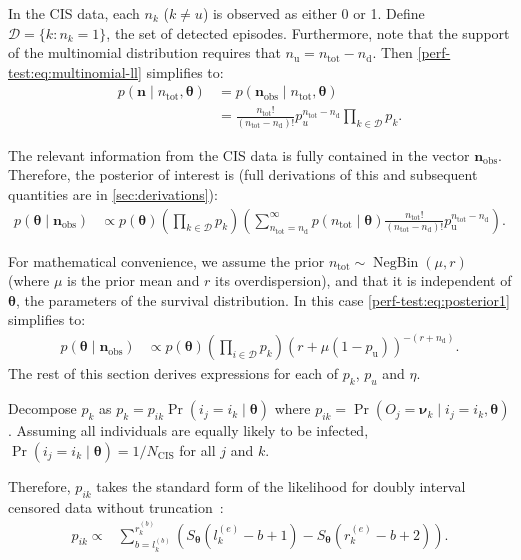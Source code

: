\documentclass[12pt]{article}
\def\dist{\sim}
\DeclareMathOperator{\prob}{\mathrm{Pr}}
\DeclareMathOperator{\NBr}{NegBin}
\newcommand{\NBc}{\NBr}
\newcommand\set{\mathcal}
\renewcommand{\vec}[1]{\bm{#1}}
\newcommand{\ssep}{:}
\newcommand{\ntot}{n_\text{tot}}
\newcommand{\ndet}{n_\text{d}}
\newcommand{\nnodet}{n_\text{u}}
\newcommand{\pnodet}{p_\text{u}}
\newcommand{\Ncis}{N_\text{CIS}}
\newcommand{\na}{\vec{n}_\text{obs}}
\begin{document}
In the CIS data, each $n_k$ ($k \neq u$) is observed as either 0 or 1.
Define $\set{D} = \{ k \ssep n_k = 1 \}$, the set of detected episodes.
Furthermore, note that the support of the multinomial distribution requires that $\nnodet = \ntot - \ndet$.
Then \cref{perf-test:eq:multinomial-ll} simplifies to:
\begin{align}
  p(\vec{n} \mid \ntot, \vec{\theta})
  &= p(\na \mid \ntot, \vec{\theta}) \\
  &= \frac{\ntot!}{(\ntot - \ndet)!} p_u^{\ntot-\ndet} \prod_{k \in \set{D}} p_k.
  \label{perf-test:eq:multinomial}
\end{align}

The relevant information from the CIS data is fully contained in the vector $\na$.
Therefore, the posterior of interest is (full derivations of this and subsequent quantities are in \cref{sec:derivations}):
\begin{align}
p(\vec{\theta} \mid \na)
&\propto  p(\vec{\theta}) \left( \prod_{k \in \set{D}} p_k \right) \left( \sum_{\ntot=\ndet}^\infty p(\ntot \mid \vec{\theta}) \frac{\ntot!}{(\ntot - \ndet)!} \pnodet^{\ntot - \ndet} \right).
\label{perf-test:eq:posterior1}
\end{align}

For mathematical convenience, we assume the prior $\ntot \dist \NBc(\mu, r)$ (where $\mu$ is the prior mean and $r$ its overdispersion), and that it is independent of $\vec{\theta}$, the parameters of the survival distribution.
In this case \cref{perf-test:eq:posterior1} simplifies to:
\begin{align}
p(\vec{\theta} \mid \na)
&\propto p(\vec{\theta}) \left( \prod_{i \in \set{D}} p_k \right) (r + \mu (1- \pnodet))^{-(r+\ndet)} \label{perf-test:eq:full-posterior}.
\end{align}
The rest of this section derives expressions for each of $p_{k}$, $p_{u}$ and $\eta$.

Decompose $p_k$ as $p_k = p_{ik} \prob(i_j = i_k \mid \vec{\theta})$
where $p_{ik} = \prob(O_j = \vec{\nu}_k \mid i_j = i_k, \vec{\theta})$.
Assuming all individuals are equally likely to be infected, $\prob(i_j = i_k \mid \vec{\theta}) = 1/\Ncis$ for all $j$ and $k$.

Therefore, $p_{ik}$ takes the standard form of the likelihood for doubly interval censored data without truncation~\citep[e.g.][]{sunEmpirical}:
\begin{align}
p_{ik}
\propto& \sum_{b = l_k^{(b)}}^{r_k^{(b)}} \left( S_{\vec{\theta}}(l_k^{(e)} - b + 1) - S_{\vec{\theta}}(r_k^{(e)} - b + 2) \right).
\label{perf-test:eq:pia}
\end{align}
\end{document}
